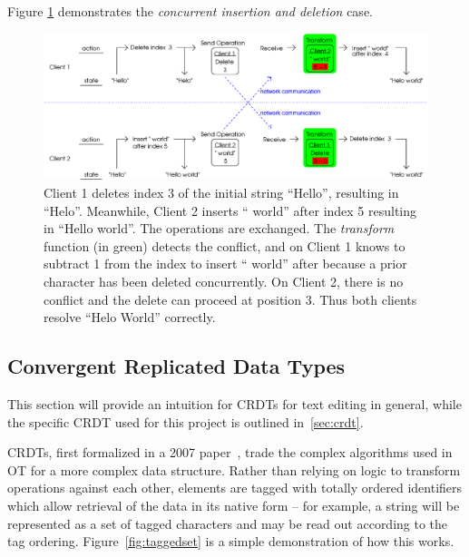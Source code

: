 \documentclass[12pt,a4paper,twoside,openright]{report}
\begin{document}
	Figure \ref{fig:ot3} demonstrates the \textit{concurrent insertion and deletion} case.
	

	\begin{figure}[H]
	\centering
	\includegraphics[width=1\linewidth]{figs/ot3.eps}
	\caption[Operational Transformations -- concurrent insertion and deletion]{Client 1 deletes index 3 of the initial string ``Hello'', resulting in ``Helo''. Meanwhile, Client 2 inserts `` world'' after index 5 resulting in ``Hello world''. The operations are exchanged. The \textit{transform} function (in green) detects the conflict, and on Client 1 knows to subtract 1 from the index to insert `` world'' after because a prior character has been deleted concurrently. On Client 2, there is no conflict and the delete can proceed at position 3. Thus both clients resolve ``Helo World'' correctly.}
	\label{fig:ot3}
	\end{figure}


	\subsection{Convergent Replicated Data Types} \label{sec:crdtoverview}
	
	This section will provide an intuition for CRDTs for text editing in general, while the specific CRDT used for this project is outlined in~\cref{sec:crdt}.

	CRDTs, first formalized in a 2007 paper~\cite{shapiro2007}, trade the complex algorithms used in OT for a more complex data structure. Rather than relying on logic to transform operations against each other, elements are tagged with totally ordered identifiers which allow retrieval of the data in its native form -- for example, a string will be represented as a set of tagged characters and may be read out according to the tag ordering. Figure~\ref{fig:taggedset} is a simple demonstration of how this works. 
	
\end{document}

